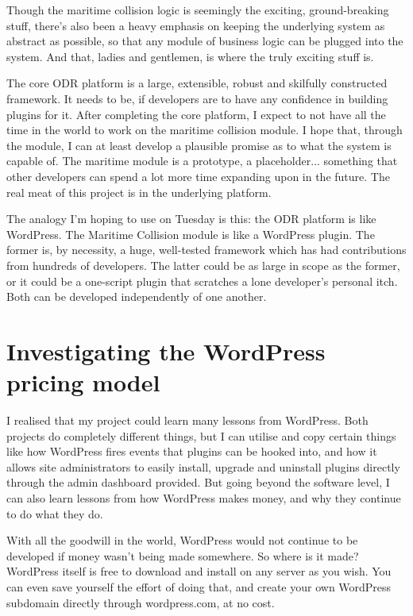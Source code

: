 Though the maritime collision logic is seemingly the exciting, ground-breaking stuff, there's also been a heavy emphasis on keeping the underlying system as abstract as possible, so that any module of business logic can be plugged into the system. And that, ladies and gentlemen, is where the truly exciting stuff is.

The core ODR platform is a large, extensible, robust and skilfully constructed framework. It needs to be, if developers are to have any confidence in building plugins for it. After completing the core platform, I expect to not have all the time in the world to work on the maritime collision module. I hope that, through the module, I can at least develop a plausible promise as to what the system is capable of. The maritime module is a prototype, a placeholder... something that other developers can spend a lot more time expanding upon in the future. The real meat of this project is in the underlying platform.

The analogy I'm hoping to use on Tuesday is this: the ODR platform is like WordPress. The Maritime Collision module is like a WordPress plugin. The former is, by necessity, a huge, well-tested framework which has had contributions from hundreds of developers. The latter could be as large in scope as the former, or it could be a one-script plugin that scratches a lone developer's personal itch. Both can be developed independently of one another.

\section{Investigating the WordPress pricing model}

I realised that my project could learn many lessons from WordPress. Both projects do completely different things, but I can utilise and copy certain things like how WordPress fires events that plugins can be hooked into, and how it allows site administrators to easily install, upgrade and uninstall plugins directly through the admin dashboard provided. But going beyond the software level, I can also learn lessons from how WordPress makes money, and why they continue to do what they do.

With all the goodwill in the world, WordPress would not continue to be developed if money wasn't being made somewhere. So where is it made? WordPress itself is free to download and install on any server as you wish. You can even save yourself the effort of doing that, and create your own WordPress subdomain directly through wordpress.com, at no cost.

